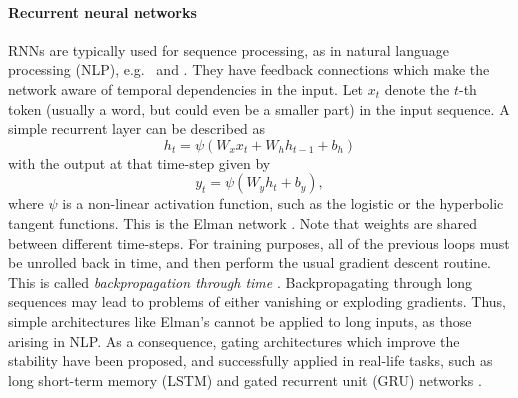  



\paragraph{Recurrent neural networks} RNNs are typically used for sequence processing, as in natural language processing (NLP), e.g.\ \parencite{hochreiter1997long} and \parencite{chung2014empirical}. They have feedback connections which make the network aware of temporal dependencies in the input.
Let $x_t$ denote the $t$-th token (usually a word, but could even be 
a smaller part) in the input sequence. A simple recurrent layer can be described as
$$
h_t = \psi(W_x x_t + W_h h_{t-1} + b_h)
$$
with the output at that time-step given by
$$
y_t = \psi(W_y h_t + b_y),
$$
where $\psi$ is a non-linear activation function, such as the logistic or the hyperbolic tangent functions. This is the Elman network \parencite{cruse2006neural}. Note that weights are shared between different time-steps. %
For training purposes, all of the previous loops must be unrolled back in time, and then perform the usual gradient descent routine.
This is called \emph{backpropagation through time} \parencite{58337}.
Backpropagating through long sequences may lead to problems
of either vanishing or exploding gradients. Thus, 
simple architectures like Elman's cannot be applied to long inputs, as those arising in NLP. 
As a consequence, gating architectures which improve the stability have been proposed, and successfully applied in real-life tasks,
such as long 
short-term memory (LSTM) \parencite{hochreiter1997long} and gated recurrent unit (GRU) networks \parencite{cho2014learning}. 

